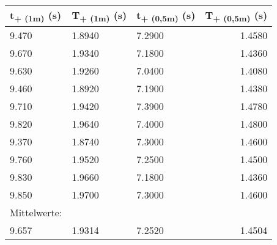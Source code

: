 \documentclass[titlepage=firstcover, captions=tableheading]{scrartcl}
\begin{document}
\begin{minipage}{\linewidth}
    \centering
    \begin{tabular}{lllr}
        \toprule
        t\textsubscript{+ (1m)} (s) & T\textsubscript{+ (1m)} (s) 
        & t\textsubscript{+ (0,5m)} (s) & T\textsubscript{+ (0,5m)} (s) \\
        \midrule
        9.470 & 1.8940 & 7.2900 & 1.4580 \\
        9.670 & 1.9340 & 7.1800 & 1.4360 \\
        9.630 & 1.9260 & 7.0400 & 1.4080 \\
        9.460 & 1.8920 & 7.1900 & 1.4380 \\
        9.710 & 1.9420 & 7.3900 & 1.4780 \\
        9.820 & 1.9640 & 7.4000 & 1.4800 \\
        9.370 & 1.8740 & 7.3000 & 1.4600 \\
        9.760 & 1.9520 & 7.2500 & 1.4500 \\
        9.830 & 1.9660 & 7.1800 & 1.4360 \\
        9.850 & 1.9700 & 7.3000 & 1.4600 \\
        \midrule
        Mittelwerte:\\
        9.657 & 1.9314 & 7.2520 & 1.4504\\
        
        \bottomrule
        
    \end{tabular}
\end{minipage}
\end{document}
